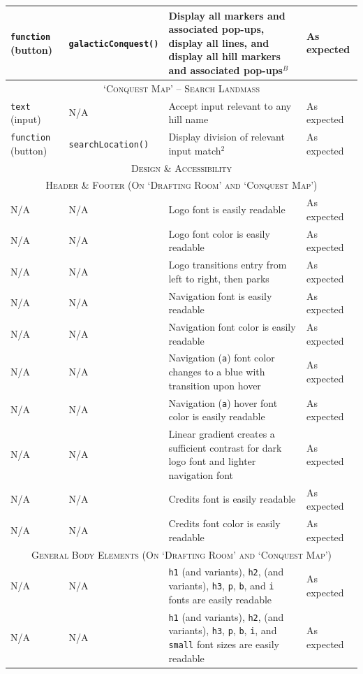 \documentclass[11pt, english]{article}
\begin{document}
\begin{center}
\begin{longtable}{p{2.5cm}p{3.5cm}p{5cm}p{1.75cm}}
		\texttt{function} (button) & \texttt{galacticConquest()} & Display all markers and associated pop-ups, display all lines, and display all hill markers and associated pop-ups$^{B}$ & As expected\\
		\hline
		\multicolumn{4}{c}{\textsc{`Conquest Map' -- Search Landmass}}\\
		\hline
		\texttt{text} (input) & N/A & Accept input relevant to any hill name & As expected\\
		\texttt{function} (button) & \texttt{searchLocation()} & Display division of relevant input match$^{2}$ & As expected\\
		\hline
		\hline
		\multicolumn{4}{c}{\textsc{Design \& Accessibility}}\\
		\hline
		\hline
		\multicolumn{4}{c}{\textsc{Header \& Footer (On `Drafting Room' and `Conquest Map')}}\\
		\hline
		N/A & N/A & Logo font is easily readable & As expected\\
		N/A & N/A & Logo font color is easily readable & As expected\\
		N/A & N/A & Logo transitions entry from left to right, then parks & As expected\\
		N/A & N/A & Navigation font is easily readable & As expected\\
		N/A & N/A & Navigation font color is easily readable & As expected\\
		N/A & N/A & Navigation (\texttt{a}) font color changes to a blue with transition upon hover & As expected\\
		N/A & N/A & Navigation (\texttt{a}) hover font color is easily readable & As expected\\
		N/A & N/A & Linear gradient creates a sufficient contrast for dark logo font and lighter navigation font & As expected\\
		N/A & N/A & Credits font is easily readable & As expected\\
		N/A & N/A & Credits font color is easily readable & As expected\\
		\hline
		\multicolumn{4}{c}{\textsc{General Body Elements (On `Drafting Room' and `Conquest Map')}}\\
		\hline
		N/A & N/A & \texttt{h1} (and variants), \texttt{h2}, (and variants), \texttt{h3}, \texttt{p}, \texttt{b}, and \texttt{i} fonts are easily readable & As expected\\
		N/A & N/A & \texttt{h1} (and variants), \texttt{h2}, (and variants), \texttt{h3}, \texttt{p}, \texttt{b}, \texttt{i}, and \texttt{small} font sizes are easily readable & As expected\\

\end{longtable}
\end{center}
\end{document}

